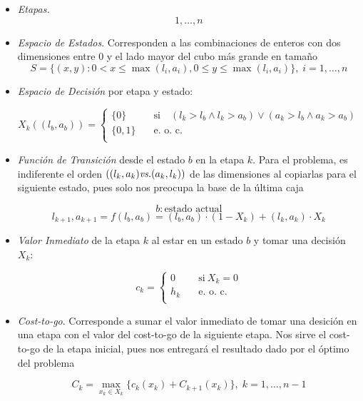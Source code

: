 \documentclass[letterpaper,10pt]{article}
\begin{document}
\begin{itemize}

\item \textit{Etapas.}    $$1, \ldots, n$$

\item \textit{Espacio de Estados}. Corresponden a las combinaciones de enteros con dos dimensiones entre 0 y el lado mayor del cubo más grande en tamaño
$$S = \{(x,y): 0 < x \leq \max(l_i,a_i), 0 \leq y \leq \max(l_i, a_i)\}, \; i = 1, \ldots, n$$ 

\item  \textit{Espacio de Decisión} por etapa y estado: 

\[
    X_k((l_b, a_b)) =
         \begin{cases}
           \{0\} &\quad\text{si}\quad (l_k > l_b \wedge l_k > a_b) \vee  (a_k > l_b \wedge a_k > a_b)   \\
           \{0,1\} &\quad\text{e. o. c. } \\
           
         \end{cases}
\]

\item \textit{Función de Transición} desde el estado $b$ en la etapa $k$. Para el problema, es indiferente el orden $((l_k, a_k) \text{\textit{vs.}} (a_k, l_k))$ de las dimensiones al copiarlas para el siguiente estado, pues solo nos preocupa la base de la última caja

$$ b: \text{estado actual}$$
$$l_{k+1}, a_{k+1} = f(l_b, a_b) = (l_b, a_b)\cdot (1-X_k) + (l_k, a_k)\cdot X_k $$

\item \textit{Valor Inmediato} de la etapa $k$ al estar en un estado $b$ y tomar una decisión $X_k$:

\[
    c_k =
         \begin{cases}
           0 &\quad\text{si} \ X_k = 0  \\
           h_k &\quad\text{e. o. c. } \\
         \end{cases}
\]

\item  \textit{Cost-to-go}. Corresponde a sumar el valor inmediato de tomar una desición en una etapa con el valor del cost-to-go de la siguiente etapa. Nos sirve el cost-to-go de la etapa inicial, pues nos entregará el resultado dado por el óptimo del problema



$$C_k = \max_{x_k \in X_k}\{c_k(x_k) + C_{k+1}(x_{k})\}, \; k = 1, \ldots, n-1$$
\end{itemize}
\end{document}
